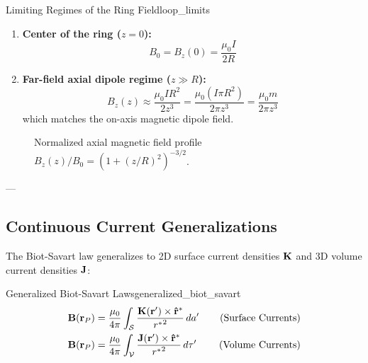 \begin{proposition}{Limiting Regimes of the Ring Field}{loop_limits}
\begin{enumerate}
    \item \textbf{Center of the ring ($z = 0$):}
    \begin{equation}
        B_0 = B_z(0) = \frac{\mu_0 I}{2R}
    \end{equation}
    \item \textbf{Far-field axial dipole regime ($z \gg R$):}
    \begin{equation}
        B_z(z) \approx \frac{\mu_0 I R^2}{2 z^3} = \frac{\mu_0 (I \pi R^2)}{2\pi z^3} = \frac{\mu_0 m}{2\pi z^3}
    \end{equation}
    which matches the on-axis magnetic dipole field.
\end{enumerate}
\end{proposition}

\begin{figure}[htbp]
    \centering
    \caption{Normalized axial magnetic field profile $B_z(z)/B_0 = (1 + (z/R)^2)^{-3/2}$.}
    \label{fig:b_profile_plot}
\end{figure}

---

\subsection{Continuous Current Generalizations}
\label{sec:continuous_currents}

The Biot-Savart law generalizes to 2D surface current densities $\vb{K}$ and 3D volume current densities $\vb{J}$:

\begin{definition}{Generalized Biot-Savart Laws}{generalized_biot_savart}
\begin{align}
    \vb{B}(\vb{r}_P) &= \frac{\mu_0}{4\pi} \int_{\mathcal{S}} \frac{\vb{K}(\vb{r}') \times \vu{r}^*}{{r^*}^2}\,da' \quad &\text{(Surface Currents)} \\
    \vb{B}(\vb{r}_P) &= \frac{\mu_0}{4\pi} \int_{\mathcal{V}} \frac{\vb{J}(\vb{r}') \times \vu{r}^*}{{r^*}^2}\,d\tau' \quad &\text{(Volume Currents)}
\end{align}
\end{definition}

